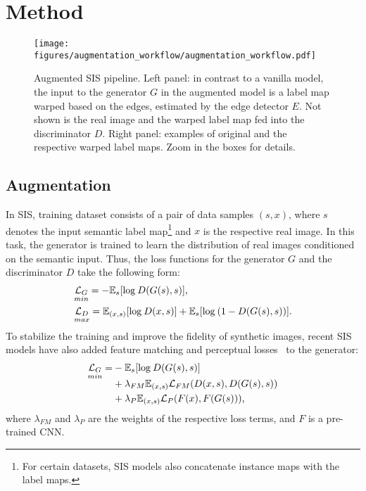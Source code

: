\documentclass[final]{cvpr}
\newcommand\+{\mkern4mu}
\begin{document}
	\section{Method}
\label{sec:methods}

\begin{figure*}[t]
	\vspace{-1em}
	\centering
	\texttt{[image: figures/augmentation\_workflow/augmentation\_workflow.pdf]}
		
	\caption{Augmented SIS pipeline. Left panel: in contrast to a vanilla model, the input to the generator $G$ in the augmented model is a label map warped based on the edges, estimated by the edge detector $E$. 
		 Not shown is the real image and the warped label map fed into the discriminator $D$. Right panel: examples of original and the respective warped label maps. Zoom in the boxes for details.}
	\vspace{-1em}
	\label{fig:aug_workflow}
\end{figure*} 

\subsection{Augmentation}
\label{subsec:augmentation}

In SIS, training dataset consists of a pair of data samples \((s, x)\), where $s$ denotes the input semantic label map\footnote{For certain datasets, SIS models also concatenate instance maps with the label maps.} and $x$ is the respective real image. In this task, the generator is trained to learn the distribution of real images conditioned on the semantic input. Thus, the loss functions for the generator $G$ and the discriminator $D$ take the following form:
\begin{equation}
\begin{aligned}
& \underset{min}{\mathcal{L}_G} = -\mathbb{E}_{s}[\text{log}\+ D(G(s), s)]\text{,}\\
& \underset{max}{\mathcal{L}_D} = \mathbb{E}_{(x, s)}[\text{log}\+ D(x, s)] + \mathbb{E}_{s}[\text{log}\+ (1 - D(G(s), s))]\text{.}
\end{aligned}
\end{equation}
To stabilize the training and improve the fidelity of synthetic images, recent SIS models have also added feature matching and perceptual losses~\cite{wang2018high} to the generator:
\begin{equation}
\begin{aligned}
\underset{min}{\mathcal{L}_G} = & -\mathbb{E}_{s}[\text{log}\+ D(G(s), s)] \\[-5pt]
& + \lambda_{FM} \mathbb{E}_{(x, s)} \mathcal{L}_{FM}(D(x, s), D(G(s), s))\\
& + \lambda_{P} \mathbb{E}_{(x, s)} \mathcal{L}_{P}(F(x), F(G(s)))\text{,}
\end{aligned}
\end{equation}
where $\lambda_{FM}$ and $\lambda_{P}$ are the weights of the respective loss terms, and $F$ is a pre-trained CNN.
\end{document}
